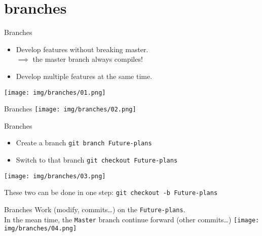 \documentclass[usenames,dvipsnames,handout,9pt]{beamer}
\begin{document}
\section{branches}

%
%
\begin{frame}{Branches}
\begin{itemize}
  \item Develop features without breaking master.\\
  $\implies$ the master branch always compiles! {\color{OliveGreen}\checkmark}
  \item Develop multiple features at the same time.

\end{itemize}
\vspace{0.5cm}
\texttt{[image: img/branches/01.png]}
\end{frame}

\begin{frame}{Branches}
  \vspace{-0.45cm}
\texttt{[image: img/branches/02.png]}
\end{frame}

\begin{frame}{Branches}
  \begin{itemize}
    \item Create a branch \lstinline|git branch Future-plans|
    \item Switch to that branch \lstinline|git checkout Future-plans|
  \end{itemize}
\vspace{-1cm}
\texttt{[image: img/branches/03.png]}
\vspace{-1cm}

These two can be done in one step: \lstinline|git checkout -b Future-plans|
\end{frame}

\begin{frame}{Branches}
Work (modify, commits\ldots) on the \texttt{Future-plans}.\\
In the mean time, the \texttt{Master} branch continue forward (other commits\ldots)
\texttt{[image: img/branches/04.png]}
\end{frame}
\end{document}
